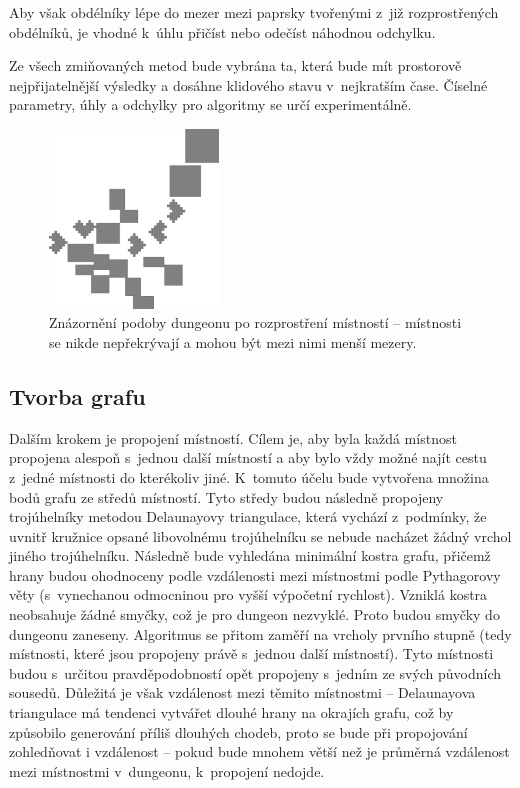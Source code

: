 Aby však obdélníky lépe  do mezer mezi paprsky tvořenými z~již rozprostřených obdélníků, je vhodné k~úhlu přičíst nebo odečíst náhodnou odchylku.
\par
Ze všech zmiňovaných metod bude vybrána ta, která bude mít prostorově nejpřijatelnější výsledky a dosáhne klidového stavu v~nejkratším čase.
Číselné parametry, úhly a odchylky pro algoritmy se určí experimentálně.
\begin{figure}[hbt]
    \centering
    \includegraphics[width=0.4\textwidth]{obrazky/navrh2.png}
    \caption{Znázornění podoby dungeonu po rozprostření místností -- místnosti se nikde nepřekrývají a mohou být mezi nimi menší mezery.}
    \label{img:navrh2}
\end{figure}


\subsection{Tvorba grafu}


Dalším krokem je propojení místností.
Cílem je, aby byla každá místnost propojena alespoň s~jednou další místností a aby bylo vždy možné najít cestu z~jedné místnosti do kterékoliv jiné.
K~tomuto účelu bude vytvořena množina bodů grafu ze středů místností.
Tyto středy budou následně propojeny trojúhelníky metodou Delaunayovy triangulace, která vychází z~podmínky, že uvnitř kružnice opsané libovolnému trojúhelníku se nebude nacházet žádný vrchol jiného trojúhelníku.
Následně bude vyhledána minimální kostra grafu, přičemž hrany budou ohodnoceny podle vzdálenosti mezi místnostmi podle Pythagorovy věty (s~vynechanou odmocninou pro vyšší výpočetní rychlost).
Vzniklá kostra neobsahuje žádné smyčky, což je pro dungeon nezvyklé.
Proto budou smyčky do dungeonu zaneseny.
Algoritmus se přitom zaměří na vrcholy prvního stupně (tedy místnosti, které jsou propojeny právě s~jednou další místností).
Tyto místnosti budou s~určitou pravděpodobností opět propojeny s~jedním ze svých původních sousedů.
Důležitá je však vzdálenost mezi těmito místnostmi -- Delaunayova triangulace má tendenci vytvářet dlouhé hrany na okrajích grafu, což by způsobilo generování příliš dlouhých chodeb, proto se bude při propojování zohledňovat i vzdálenost -- pokud bude mnohem větší než je průměrná vzdálenost mezi místnostmi v~dungeonu, k~propojení nedojde.

